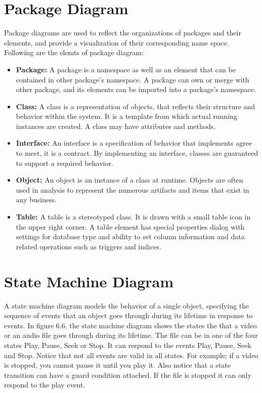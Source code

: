 \documentclass[openany,12pt]{report}
\begin{document}
\newpage
\section{Package Diagram}
\hspace*{0.5in} Package diagrams are used to reflect the organizations of packages and their elements, and provide a visualization of their corresponding name space. Following are the elemts of package diagram:
\begin{itemize}
\item{\textbf{Package:} A package is a namespace as well as an element that can be contained in other package's namespace. A package can own or merge with other package, and its elements can be imported into a package's namespace.}
\item{\textbf{Class:} A class is a representation of objects, that reflects their structure and behavior within the system. It is a template from which actual running instances are created. A class may have attributes and methods.}
\item{\textbf{Interface:} An interface is a specification of behavior that implements agree to meet, it is a contract. By implementing an interface, classes are guaranteed to support a required behavior.}
\item{\textbf{Object:} An object is an instance of a class at runtime. Objects are often used in analysis to represent the numerous artifacts and items that exist in any business.}
\item{\textbf{Table:} A table is a stereotyped class. It is drawn with a small table icon in the upper right corner. A table element has special properties dialog with settings for database type and ability to set column information and data related operations such as triggers and indices.}
\end{itemize}


\newpage
\section{State Machine Diagram}
\hspace*{0.5in}A state machine diagram models the behavior of a single object, specifying the sequence of events that an object goes through during its lifetime in response to events. In figure 6.6, the state machine diagram shows the states the that a video or an audio file goes through during its lifetime. The file can be in one of the four states Play, Pause, Seek or Stop. It can respond to the events Play, Pause, Seek and Stop. Notice that not all events are valid in all states. For example; if a video is stopped, you cannot pause it until you play it. Also notice that a state transition can have a guard condition attached. If the file is stopped it can only respond to the play event.
\end{document}
